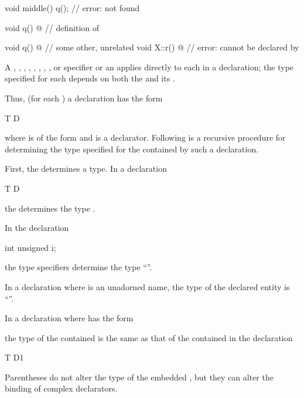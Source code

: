 \begin{itemize}
\begin{example}
\begin{codeblock}
{  void middle() {
    q();                        // error:  not found
  }

  void q() { @\commentellip@ }        // definition of 
}

void q() { @\commentellip@ }          // some other, unrelated 
void X::r() { @\commentellip@ }       // error:  cannot be declared by 
\end{codeblock}
\end{example}
\end{itemize}

\pnum
A
,
,
,
,
,
,
,
,
or
specifier
or an 
applies directly to each 
in a declaration;
the type specified for each  depends on
both the  and its .

\pnum
Thus, (for each ) a declaration has the form
\begin{codeblock}
T D
\end{codeblock}
where
is of the form 
and
is a declarator.
Following is a recursive procedure for determining
the type specified for the contained
by such a declaration.

\pnum
First, the
determines a type.
In a declaration
\begin{codeblock}
T D
\end{codeblock}
the
determines the type
.
\begin{example}
In the declaration
\begin{codeblock}
int unsigned i;
\end{codeblock}
the type specifiers
determine the type
``''.
\end{example}

\pnum
In a declaration
where
is an unadorned name, the type of the declared entity is
``''.

\pnum
In a declaration
where
has the form
\begin{ncsimplebnf}
\terminal{(}  \terminal{)}
\end{ncsimplebnf}
the type of the contained
is the same as that of the contained
in the declaration
\begin{codeblock}
T D1
\end{codeblock}
%
Parentheses do not alter the type of the embedded
,
but they can alter the binding of complex declarators.

